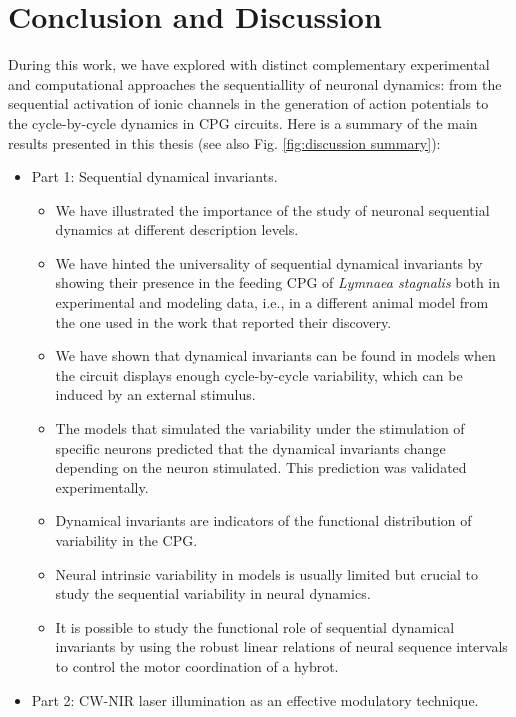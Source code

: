 \chapter{Conclusion and Discussion} %
\label{c-conclusion}

During this work, we have explored with distinct complementary experimental and computational approaches the sequentiallity of neuronal dynamics: from the sequential activation of ionic channels in the generation of action potentials to the cycle-by-cycle dynamics in CPG circuits. Here is a summary of the main results presented in this thesis (see also Fig. \ref{fig:discussion summary}):

\begin{itemize}
	\item Part 1: Sequential dynamical invariants.
 \begin{itemize}
     \item We have illustrated the importance of the study of neuronal sequential dynamics at different description levels.
     \item We have hinted the universality of sequential dynamical invariants by showing their  presence in the feeding CPG of  \textit{Lymnaea stagnalis} both in experimental and modeling data, i.e., in a different animal model from the one used in the work that reported their discovery.
     \item We have shown that dynamical invariants can be found in models when the circuit displays enough cycle-by-cycle variability, which can be induced by an external stimulus.
     \item The models that simulated the variability under the stimulation of specific neurons predicted that the dynamical invariants change depending on the neuron stimulated. This prediction was validated experimentally.
     \item Dynamical invariants are indicators of the functional distribution of  variability  in the CPG.
     \item Neural intrinsic variability in models is usually limited but crucial to study the sequential variability in neural dynamics.
     \item It is possible to study the functional role of sequential dynamical invariants by using  the robust linear relations of neural sequence intervals to control the motor coordination of a hybrot.
 \end{itemize}
	\item Part 2: CW-NIR laser illumination as an effective modulatory technique.

\end{itemize}
